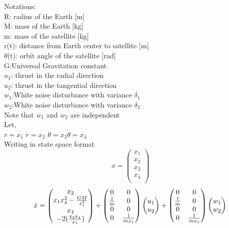 \documentclass[journal,onecolumn]{IEEEtran}
\begin{document}
Notations:\\
R: radius of the Earth [m]\\
M: mass of the Earth [kg]\\
m: mass of the satellite [kg]\\
r(t): distance from Earth center to satellite [m]\\
$\theta$(t): orbit angle of the satellite [rad]\\
G:Universal Gravitation constant\\
$u_{1}$: thrust in the radial direction\\
$u_{2}$: thrust in the tangential direction\\
$w_{1}$:White noise disturbance with variance $\delta_{1}$\\
$w_{2}$:White noise disturbance with variance $\delta_{2}$\\
Note that $w_{1}$ and $w_{2}$ are independent\\
Let,\\
$r=x_{1}$ \hspace{1cm}$\dot r=x_{2}$ \hspace{1cm}$\theta=x_{3}$\hspace{1cm}$\dot\theta=x_{4}$\\
Writing in state space format\\
\begin{equation}
x=\begin{pmatrix}
x_1\\
x_2\\
x_3\\
x_4\\
\end{pmatrix}
\end{equation}
\begin{equation}
\dot{x}=\begin{pmatrix}
x_2\\
x_1x_4^2-\frac{GM}{x_1^2}\\
x_4\\
-2 (\frac{x_2x_4}{x_1})
\end{pmatrix}+\begin{pmatrix}
0&0\\
\frac{1}{m}&0\\
0&0\\
0&\frac{1}{mx_1}
\end{pmatrix}
\begin{pmatrix}
u_1\\
u_2
\end{pmatrix}
+\begin{pmatrix}
0&0\\
\frac{1}{m}&0\\
0&0\\
0&\frac{1}{mx_1}
\end{pmatrix}
\begin{pmatrix}
w_1\\
w_2
\end{pmatrix}\\
\end{equation}
\end{document}
